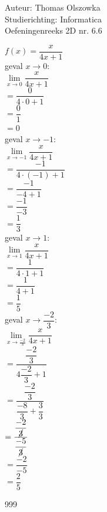 \documentclass[a4paper]{article}
\begin{document}
\noindent \large Auteur: Thomas Olszowka \\
\noindent \large Studierichting: Informatica \\
\noindent \large Oefeningenreeks 2D nr. 6.6 \\



\medskip

\normalsize

$f(x) = \dfrac{x}{4x+1}$ \\

geval $x \rightarrow 0$: \\

$\lim\limits_{x \rightarrow 0} \dfrac{x}{4x+1}$ \\

$= \dfrac{0}{4 \cdot 0 +1}$ \\

$= \dfrac{0}{1}$ \\

$= 0$ \\

geval $x \rightarrow -1$: \\

$\lim\limits_{x \rightarrow -1} \dfrac{x}{4x+1}$ \\

$= \dfrac{-1}{4 \cdot (-1) +1}$ \\

$= \dfrac{-1}{-4+1}$ \\

$= \dfrac{-1}{-3}$ \\

$= \dfrac{1}{3}$ \\

geval $x \rightarrow 1$: \\

$\lim\limits_{x \rightarrow 1} \dfrac{x}{4x+1}$ \\

$= \dfrac{1}{4 \cdot 1 +1}$ \\

$= \dfrac{1}{4+1}$ \\

$= \dfrac{1}{5}$ \\

geval $x \rightarrow \dfrac{-2}{3}$: \\

$\lim\limits_{x \rightarrow \tfrac{-2}{3}} \dfrac{x}{4x+1}$ \\

$= \dfrac{\dfrac{-2}{3}}{4 \dfrac{-2}{3} +1}$ \\

$= \dfrac{\dfrac{-2}{3}}{\dfrac{-8}{3} +\dfrac{3}{3}}$ \\

$= \dfrac{\dfrac{-2}{\cancel{3}}}{\dfrac{-5}{\cancel{3}}}$ \\

$= \dfrac{-2}{-5}$ \\

$= \dfrac{2}{5}$ \\

\begin{thebibliography}{999}
\end{thebibliography}
\end{document}
